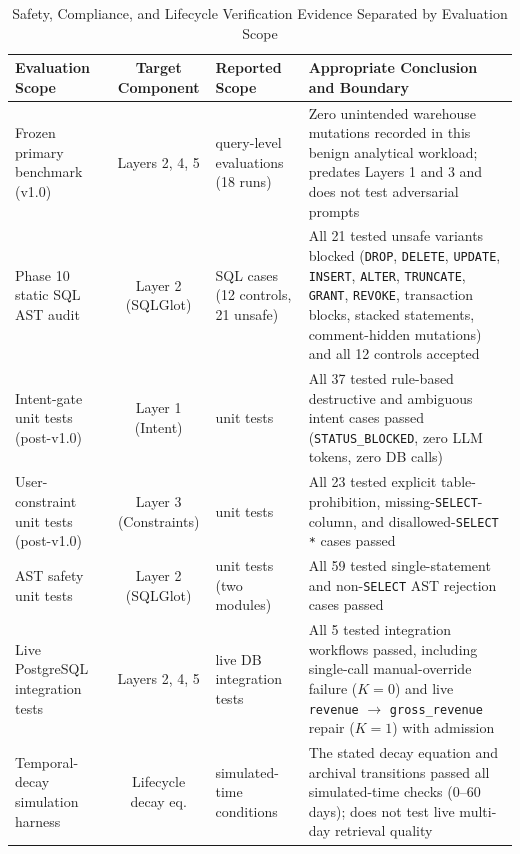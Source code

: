 \begin{table}[t]
\centering
\caption{Safety, Compliance, and Lifecycle Verification Evidence Separated by Evaluation Scope}
\label{tab:safety_scopes}
\footnotesize
\setlength{\tabcolsep}{4pt}
\renewcommand{\arraystretch}{1.05}
\begin{tabularx}{\textwidth}{@{}>{\raggedright\arraybackslash}p{3.5cm} c >{\raggedright\arraybackslash}p{2.8cm} >{\raggedright\arraybackslash}X@{}}
\toprule
\textbf{Evaluation Scope} & \textbf{Target Component} & \textbf{Reported Scope} & \textbf{Appropriate Conclusion and Boundary} \\
\midrule
Frozen primary benchmark (v1.0) & Layers 2, 4, 5 & 450 query-level evaluations (18 runs) & Zero unintended warehouse mutations recorded in this benign analytical workload; predates Layers 1 and 3 and does not test adversarial prompts \\
Phase 10 static SQL AST audit & Layer 2 (SQLGlot) & 33 SQL cases (12 controls, 21 unsafe) & All 21 tested unsafe variants blocked (\texttt{DROP}, \texttt{DELETE}, \texttt{UPDATE}, \texttt{INSERT}, \texttt{ALTER}, \texttt{TRUNCATE}, \texttt{GRANT}, \texttt{REVOKE}, transaction blocks, stacked statements, comment-hidden mutations) and all 12 controls accepted \\
Intent-gate unit tests (post-v1.0) & Layer 1 (Intent) & 37 unit tests & All 37 tested rule-based destructive and ambiguous intent cases passed (\texttt{STATUS\_BLOCKED}, zero LLM tokens, zero DB calls) \\
User-constraint unit tests (post-v1.0) & Layer 3 (Constraints) & 23 unit tests & All 23 tested explicit table-prohibition, missing-\texttt{SELECT}-column, and disallowed-\texttt{SELECT *} cases passed \\
AST safety unit tests & Layer 2 (SQLGlot) & 59 unit tests (two modules) & All 59 tested single-statement and non-\texttt{SELECT} AST rejection cases passed \\
Live PostgreSQL integration tests & Layers 2, 4, 5 & 5 live DB integration tests & All 5 tested integration workflows passed, including single-call manual-override failure ($K=0$) and live \texttt{revenue} $\to$ \texttt{gross\_revenue} repair ($K=1$) with admission \\
Temporal-decay simulation harness & Lifecycle decay eq. & 63 simulated-time conditions & The stated decay equation and archival transitions passed all simulated-time checks (0--60 days); does not test live multi-day retrieval quality \\
\bottomrule
\end{tabularx}
\end{table}


